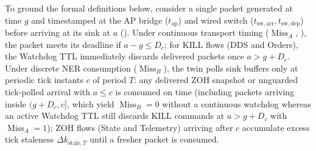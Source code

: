 \documentclass[11pt,a4paper]{article}
\newcommand{\MissA}{\ensuremath{\operatorname{Miss}_A}}
\newcommand{\MissB}{\ensuremath{\operatorname{Miss}_B}}
\begin{document}
To ground the formal definitions below, consider a single packet generated at time $g$ and timestamped at the AP bridge ($t_{\mathrm{ap}}$) and wired switch ($t_{\mathrm{sw,arr}}, t_{\mathrm{sw,dep}}$) before arriving at its sink at $a$ (). Under continuous transport timing ($\MissA$, ), the packet meets its deadline if $a - g \le D_c$; for KILL flows (DDS and Orders), the Watchdog TTL immediately discards delivered packets once $a > g + D_c$. Under discrete NER consumption ($\MissB$), the twin polls sink buffers only at periodic tick instants $c$ of period $T$: any delivered ZOH snapshot or unguarded tick-polled arrival with $a \le c$ is consumed on time (including packets arriving inside $(g + D_c, c]$, which yield $\MissB=0$ without a continuous watchdog whereas an active Watchdog TTL still discards KILL commands at $a > g + D_c$ with $\MissA=1$); ZOH flows (State and Telemetry) arriving after $c$ accumulate excess tick staleness $\Delta k_{\mathrm{stale},T}$ until a fresher packet is consumed.
\end{document}
